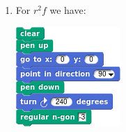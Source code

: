 \documentclass[noauthor,nooutcomes,12pt,hints]{ximera}
\begin{document}
\begin{question}
\begin{freeResponse}
\begin{enumerate}
\begin{center}
      \end{center}
    \item For $r^2f$ we have:
      \begin{center}
        \includegraphics[width=.3\textwidth]{r2fTriSCRIPT.png}   \qquad {}
      \end{center}
    \end{enumerate}
    \end{freeResponse}
\end{question}
\mynewpage
\end{document}
